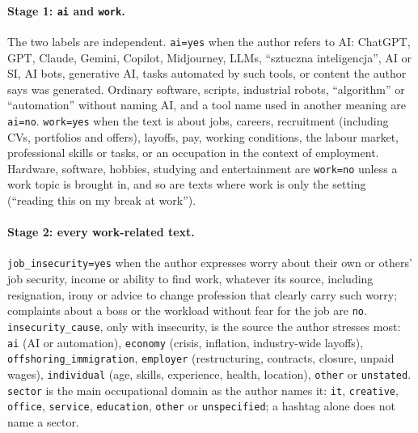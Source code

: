\documentclass[11pt]{article}
\begin{document}
\paragraph{Stage 1: \texttt{ai} and \texttt{work}.} The two labels are
independent. \texttt{ai=yes} when the author refers to AI: ChatGPT, GPT,
Claude, Gemini, Copilot, Midjourney, LLMs, ``sztuczna inteligencja'', AI or
SI, AI bots, generative AI, tasks automated by such tools, or content the
author says was generated. Ordinary software, scripts, industrial robots,
``algorithm'' or ``automation'' without naming AI, and a tool name used in
another meaning are \texttt{ai=no}. \texttt{work=yes} when the text is about
jobs, careers, recruitment (including CVs, portfolios and offers), layoffs,
pay, working conditions, the labour market, professional skills or tasks, or
an occupation in the context of employment. Hardware, software, hobbies,
studying and entertainment are \texttt{work=no} unless a work topic is
brought in, and so are texts where work is only the setting (``reading this
on my break at work'').

\paragraph{Stage 2: every work-related text.} \texttt{job\_insecurity=yes}
when the author expresses worry about their own or others' job security,
income or ability to find work, whatever its source, including resignation,
irony or advice to change profession that clearly carry such worry;
complaints about a boss or the workload without fear for the job are
\texttt{no}. \texttt{insecurity\_cause}, only with insecurity, is the source
the author stresses most: \texttt{ai} (AI or automation),
\texttt{economy} (crisis, inflation, industry-wide layoffs),
\texttt{offshoring\_immigration}, \texttt{employer} (restructuring,
contracts, closure, unpaid wages), \texttt{individual} (age, skills,
experience, health, location), \texttt{other} or \texttt{unstated}.
\texttt{sector} is the main occupational domain as the author names it:
\texttt{it}, \texttt{creative}, \texttt{office}, \texttt{service},
\texttt{education}, \texttt{other} or \texttt{unspecified}; a hashtag alone
does not name a sector.
\end{document}
